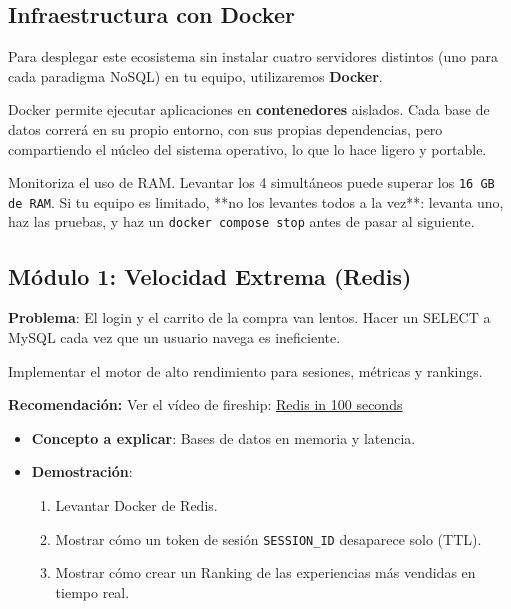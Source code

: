 \documentclass[12pt,a4paper]{article}
\begin{document}
\subsection{Infraestructura con Docker}
Para desplegar este ecosistema sin instalar cuatro servidores distintos (uno para cada paradigma NoSQL) en tu equipo, utilizaremos \textbf{Docker}. 

\begin{tcolorbox}[title=¿Qué es Docker?]
Docker permite ejecutar aplicaciones en \textbf{contenedores} aislados. Cada base de datos correrá en su propio entorno, con sus propias dependencias, pero compartiendo el núcleo del sistema operativo, lo que lo hace ligero y portable.
\end{tcolorbox}


\begin{tcolorbox}[title=Gestión de Recursos de Hardware]
Monitoriza el uso de RAM. Levantar los 4 simultáneos puede superar los \texttt{16 GB de RAM}. Si tu equipo es limitado, **no los levantes todos a la vez**: levanta uno, haz las pruebas, y haz un \texttt{docker compose stop} antes de pasar al siguiente.
\end{tcolorbox}


\subsection{Módulo 1: Velocidad Extrema (Redis)}

\textbf{Problema}: El login y el carrito de la compra van lentos. Hacer un SELECT a MySQL cada vez que un usuario navega es ineficiente.

\begin{objetivo}
Implementar el motor de alto rendimiento para sesiones, métricas y rankings.
\end{objetivo}

\textbf{Recomendación: } Ver el vídeo de fireship: \href{https://www.youtube.com/watch?v=G1rOthIU-uo}{Redis in 100 seconds}



\begin{itemize}
    \item \textbf{Concepto a explicar}: Bases de datos en memoria y latencia.
    \item \textbf{Demostración}:
    \begin{enumerate}
        \item Levantar Docker de Redis.
        \item Mostrar cómo un token de sesión \texttt{SESSION\_ID} desaparece solo (TTL).
        \item Mostrar cómo crear un Ranking de las experiencias más vendidas en tiempo real.
    \end{enumerate}
\end{itemize}
\end{document}
